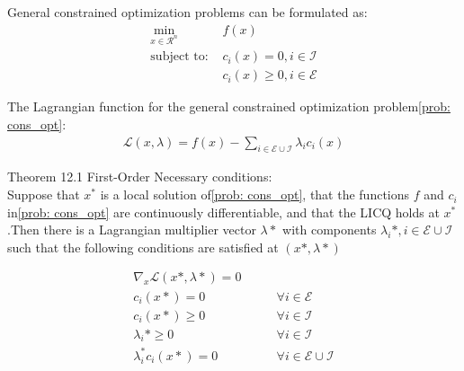 General constrained optimization problems can be formulated as:
\begin{subequations}
    \begin{align*}
        \min_{x\in\mathcal{R}^n} &f(x) \tag{12.1} \label{prob: cons_opt}\\
        \text{subject to: } &c_i(x) = 0, i\in\mathcal{I}\\
        &c_i(x) \geq 0, i\in\mathcal{E}
    \end{align*}
\end{subequations}

The Lagrangian function for the general constrained optimization problem\eqref{prob: cons_opt}:
\begin{align}
    \mathcal{L}(x, \lambda) = f(x) - \sum_{i\in\mathcal{E}\cup\mathcal{I}} \lambda_i c_i(x) \tag{12.33} \label{Lag: general_cons_opt}
\end{align}

Theorem 12.1 First-Order Necessary conditions:\\
Suppose that $x^*$ is a local solution of\eqref{prob: cons_opt}, that the functions $f$ and $c_i$ in\eqref{prob: cons_opt}
are continuously differentiable, and that the LICQ holds at $x^*$.Then there is a Lagrangian multiplier vector $\lambda*$
with components $\lambda_i*, i\in\mathcal{E}\cup\mathcal{I}$ such that the following conditions are satisfied at $(x*, \lambda*)$

\begin{align}
    \nabla_x \mathcal{L}(x*, \lambda*) = 0& \tag{12.34a} \label{KKT: derivative}\\
    c_i(x*) = 0 & \qquad \forall i\in\mathcal{E} \tag{12.34b} \label{KKT: equality}\\
    c_i(x*) \geq 0 & \qquad \forall i\in\mathcal{I} \tag{12.34c} \label{KKT: inequality}\\
    \lambda_i* \geq 0 & \qquad \forall i\in\mathcal{I} \tag{12.34d} \label{KKT: multiplier}\\
    \lambda_i^*c_i(x*) = 0 & \qquad \forall i \in\mathcal{E}\cup\mathcal{I} \tag{12.34e} \label{KKT: complementary}
\end{align}
